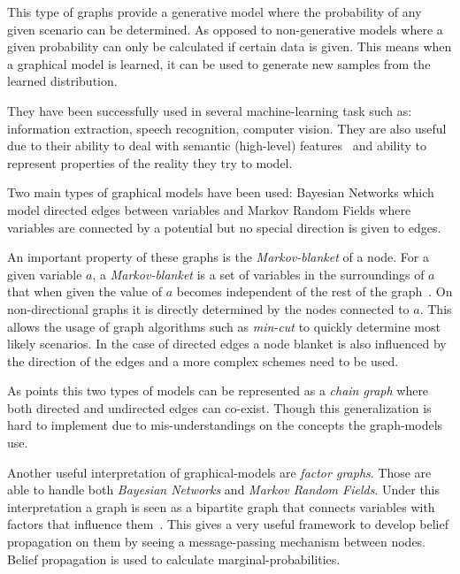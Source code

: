 This type of graphs provide a generative model where the probability of any
given scenario can be determined. As opposed to non-generative models where a
given probability can only be calculated if certain data is given.
This means when a graphical model is learned, it can be used to generate new
samples from the learned distribution.

They have been successfully used in several machine-learning task such as:
information extraction, speech recognition, computer vision.
They are also useful due to their ability to deal with semantic (high-level)
features~\citep{boutell2006factor} and ability to represent properties of the
reality they try to model.

Two main types of graphical models have been used: Bayesian Networks which model
directed edges between variables and Markov Random Fields where variables are
connected by a potential but no special direction is given to edges.

An important property of these graphs is the \emph{Markov-blanket} of a node.
For a given variable $a$, a \emph{Markov-blanket} is a set of variables in the
surroundings of $a$ that when given the value of $a$ becomes independent of the
rest of the graph~\citep{pearl1988probabilistic}.
On non-directional graphs it is directly determined by the nodes connected to $a$.
This allows the usage of graph algorithms such as \emph{min-cut} to quickly
determine most likely scenarios. In the case of directed edges a node blanket is
also influenced by the direction of the edges and a more complex schemes need to
be used.

As \cite{lauritzen2002chain} points this two types of models can be represented
as a \emph{chain graph} where both directed and undirected edges can co-exist.
Though this generalization is hard to implement due to mis-understandings on the
concepts the graph-models use.

Another useful interpretation of graphical-models are \emph{factor graphs}.
Those are able to handle both \emph{Bayesian Networks} and
\emph{Markov Random Fields}. Under this interpretation a graph is seen as a
bipartite graph that connects variables with factors that influence
them~\citep{bishop2006pattern}.
This gives a very useful framework to develop belief propagation on them by
seeing a message-passing mechanism between nodes. Belief propagation is used to
calculate marginal-probabilities.

